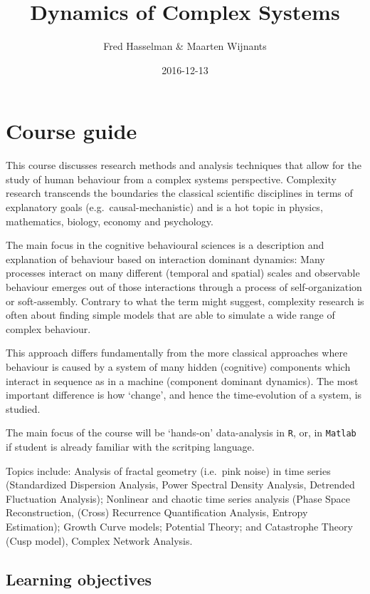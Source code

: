 \documentclass[]{book}
\title{Dynamics of Complex Systems}
\author{Fred Hasselman \& Maarten Wijnants}
\date{2016-12-13}
\let\stdsection\section
\renewcommand\section{\newpage\stdsection}
\begin{document}
\maketitle

{
\setcounter{tocdepth}{1}
\tableofcontents
}
\chapter{\texorpdfstring{\textbf{Course
guide}}{Course guide}}\label{course-guide}

This course discusses research methods and analysis techniques that
allow for the study of human behaviour from a complex systems
perspective. Complexity research transcends the boundaries the classical
scientific disciplines in terms of explanatory goals
(e.g.~causal-mechanistic) and is a hot topic in physics, mathematics,
biology, economy and psychology.

The main focus in the cognitive behavioural sciences is a description
and explanation of behaviour based on interaction dominant dynamics:
Many processes interact on many different (temporal and spatial) scales
and observable behaviour emerges out of those interactions through a
process of self-organization or soft-assembly. Contrary to what the term
might suggest, complexity research is often about finding simple models
that are able to simulate a wide range of complex behaviour.

This approach differs fundamentally from the more classical approaches
where behaviour is caused by a system of many hidden (cognitive)
components which interact in sequence as in a machine (component
dominant dynamics). The most important difference is how `change', and
hence the time-evolution of a system, is studied.

The main focus of the course will be `hands-on' data-analysis in
\texttt{R}, or, in \texttt{Matlab} if student is already familiar with
the scritping language.

Topics include: Analysis of fractal geometry (i.e.~pink noise) in time
series (Standardized Dispersion Analysis, Power Spectral Density
Analysis, Detrended Fluctuation Analysis); Nonlinear and chaotic time
series analysis (Phase Space Reconstruction, (Cross) Recurrence
Quantification Analysis, Entropy Estimation); Growth Curve models;
Potential Theory; and Catastrophe Theory (Cusp model), Complex Network
Analysis.

\section{Learning objectives}\label{learning-objectives}
\end{document}
